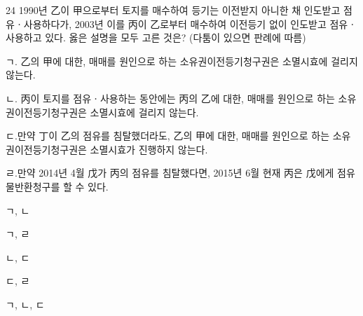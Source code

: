 \begin{question}{24}
1990년 乙이 甲으로부터 토지를 매수하여 등기는 이전받지 아니한 채 인도받고 점유ㆍ사용하다가, 2003년 이를 丙이 乙로부터 매수하여 이전등기 없이 인도받고 점유ㆍ사용하고 있다. 옳은 설명을 모두 고른 것은? (다툼이 있으면 판례에 따름)
\begin{framedtext}
ㄱ. 乙의 甲에 대한, 매매를 원인으로 하는 소유권이전등기청구권은 소멸시효에 걸리지 않는다. \par
ㄴ. 丙이 토지를 점유ㆍ사용하는 동안에는 丙의 乙에 대한, 매매를 원인으로 하는 소유권이전등기청구권은 소멸시효에 걸리지 않는다. \par
ㄷ.만약 丁이 乙의 점유를 침탈했더라도, 乙의 甲에 대한, 매매를 원인으로 하는 소유권이전등기청구권은 소멸시효가 진행하지 않는다. \par
ㄹ.만약 2014년 4월 戊가 丙의 점유를 침탈했다면, 2015년 6월 현재 丙은 戊에게 점유물반환청구를 할 수 있다.
\end{framedtext}
\begin{choices}
  \item ㄱ, ㄴ
  \item ㄱ, ㄹ
  \item ㄴ, ㄷ
  \item ㄷ, ㄹ
  \item ㄱ, ㄴ, ㄷ
\end{choices}
\end{question}

